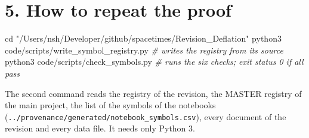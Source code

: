 \documentclass[
  10pt,
]{article}
\newenvironment{Shaded}{}{}
\newcommand{\BuiltInTok}[1]{\textcolor[rgb]{0.00,0.50,0.00}{#1}}
\newcommand{\CommentTok}[1]{\textcolor[rgb]{0.38,0.63,0.69}{\textit{#1}}}
\newcommand{\ExtensionTok}[1]{#1}
\newcommand{\NormalTok}[1]{#1}
\newcommand{\StringTok}[1]{\textcolor[rgb]{0.25,0.44,0.63}{#1}}
\begin{document}
\hypertarget{how-to-repeat-the-proof}{%
\section{5. How to repeat the proof}\label{how-to-repeat-the-proof}}

\begin{Shaded}
\begin{Highlighting}[]
\BuiltInTok{cd} \StringTok{"/Users/nsh/Developer/github/spacetimes/Revision\_Deflation"}
\ExtensionTok{python3}\NormalTok{ code/scripts/write\_symbol\_registry.py   }\CommentTok{\# writes the registry from its source}
\ExtensionTok{python3}\NormalTok{ code/scripts/check\_symbols.py           }\CommentTok{\# runs the six checks; exit status 0 if all pass}
\end{Highlighting}
\end{Shaded}

The second command reads the registry of the revision, the MASTER
registry of the main project, the list of the symbols of the notebooks
(\texttt{../provenance/generated/notebook\_symbols.csv}), every document
of the revision and every data file. It needs only Python 3.
\end{document}
